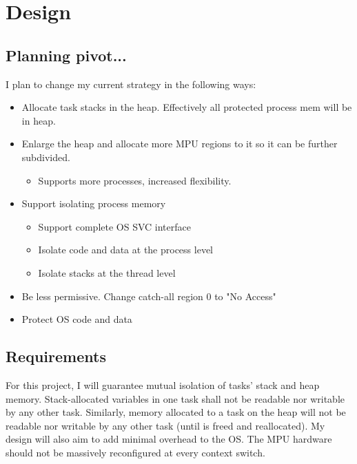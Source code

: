 \chapter{Design}

\section{Planning pivot...}

I plan to change my current strategy in the following ways:

\begin{itemize}
    
 \item Allocate task stacks in the heap. Effectively all protected process mem will be in heap.
 \item Enlarge the heap and allocate more MPU regions to it so it can be further subdivided.
    \begin{itemize}
        \item Supports more processes, increased flexibility.
    \end{itemize}
 \item Support isolating process memory
    \begin{itemize}
        \item Support complete OS SVC interface
        \item Isolate code and data at the process level
        \item Isolate stacks at the thread level
    \end{itemize}
 \item Be less permissive. Change catch-all region 0 to "No Access"
 \item Protect OS code and data

\end{itemize}


\section{Requirements}

For this project, I will guarantee mutual isolation of tasks' stack and heap memory. Stack-allocated variables in one task shall not be readable nor writable by any other task. Similarly, memory allocated to a task on the heap will not be readable nor writable by any other task (until is freed and reallocated). My design will also aim to add minimal overhead to the OS. The MPU hardware should not be massively reconfigured at every context switch.

